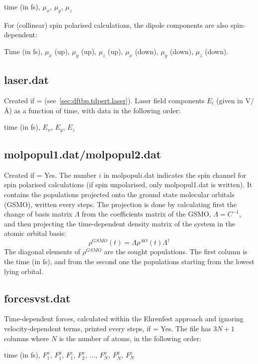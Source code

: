 time (in fs), $\mu_x$, $\mu_y$, $\mu_z$

For (collinear) spin polarised calculations, the dipole components are
also spin-dependent:

Time (in fs), $\mu_x$ (up), $\mu_y$ (up), $\mu_z$ (up), $\mu_x$
(down), $\mu_y$ (down), $\mu_z$ (down).

\subsection{laser.dat}

Created if  = 
(see~\ref{sec:dftbp.tdpert.laser}). Laser field components $E_i$ (given in
V/\AA) as a function of time, with data in the following order:

time (in fs), $E_x$, $E_y$, $E_z$

\subsection{molpopul1.dat/molpopul2.dat}

Created if  = Yes. The number $i$ in molpopul$i$.dat
indicates the spin channel for spin polarised calculations (if spin
unpolarised, only molpopul1.dat is written). It contains the
populations projected onto the ground state molecular orbitals (GSMO),
written every  steps. The projection is done by
calculating first the change of basis matrix $\Lambda$ from the
coefficients matrix of the GSMO, $\Lambda = C^{-1}$, and then
projecting the time-dependent density matrix of the system in the
atomic orbital basis:
$$\rho^{GSMO}(t) = \Lambda \rho^{AO}(t) \Lambda^{\dagger} $$ The
diagonal elements of $\rho^{GSMO}$ are the sought populations. The
first column is the time (in fs), and from the second one the
populations starting from the lowest lying orbital.

\subsection{forcesvst.dat}

Time-dependent forces, calculated within the Ehrenfest approach and
ignoring velocity-dependent terms, printed every 
steps, if  = Yes. The file has $3N +1$ columns where $N$ is
the number of atoms, in the following order:

time (in fs), $F_1^x$, $F_1^y$, $F_1^z$, $F_2^x$, $\dots$, $F_N^x$,
$F_N^y$, $F_N^z$

